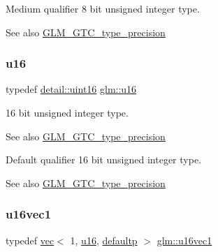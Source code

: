 Medium qualifier 8 bit unsigned integer type. \begin{DoxySeeAlso}{See also}
\mbox{\hyperlink{group__gtc__type__precision}{G\+L\+M\+\_\+\+G\+T\+C\+\_\+type\+\_\+precision}} 
\end{DoxySeeAlso}
\mbox{\label{group__gtc__type__precision_gae7a1571503f83d2264ddfa705a6b082a}} 
\subsubsection{\texorpdfstring{u16}{u16}}
{\footnotesize\ttfamily typedef \mbox{\hyperlink{namespaceglm_1_1detail_a47b2a7d006d187338e8031a352d1ce56}{detail\+::uint16}} \mbox{\hyperlink{group__gtc__type__precision_gae7a1571503f83d2264ddfa705a6b082a}{glm\+::u16}}}

16 bit unsigned integer type. \begin{DoxySeeAlso}{See also}
\mbox{\hyperlink{group__gtc__type__precision}{G\+L\+M\+\_\+\+G\+T\+C\+\_\+type\+\_\+precision}}
\end{DoxySeeAlso}
Default qualifier 16 bit unsigned integer type. \begin{DoxySeeAlso}{See also}
\mbox{\hyperlink{group__gtc__type__precision}{G\+L\+M\+\_\+\+G\+T\+C\+\_\+type\+\_\+precision}} 
\end{DoxySeeAlso}
\mbox{\label{group__gtc__type__precision_ga40d9e5ab8120f10efcfd7c88436c4a81}} 
\subsubsection{\texorpdfstring{u16vec1}{u16vec1}}
{\footnotesize\ttfamily typedef \mbox{\hyperlink{structglm_1_1vec}{vec}}$<$ 1, \mbox{\hyperlink{group__gtc__type__precision_gae7a1571503f83d2264ddfa705a6b082a}{u16}}, \mbox{\hyperlink{namespaceglm_a36ed105b07c7746804d7fdc7cc90ff25a9d21ccd8b5a009ec7eb7677befc3bf51}{defaultp}} $>$ \mbox{\hyperlink{group__gtc__type__precision_ga40d9e5ab8120f10efcfd7c88436c4a81}{glm\+::u16vec1}}}

